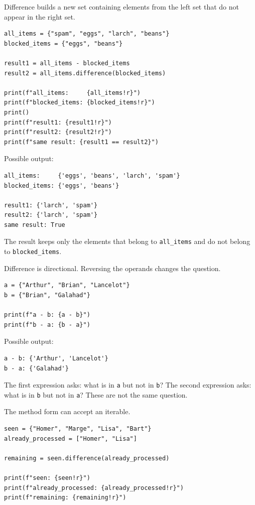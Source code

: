 Difference builds a new set containing elements from the left set that do not appear in the right set.

\begin{verbatim}
all_items = {"spam", "eggs", "larch", "beans"}
blocked_items = {"eggs", "beans"}

result1 = all_items - blocked_items
result2 = all_items.difference(blocked_items)

print(f"all_items:     {all_items!r}")
print(f"blocked_items: {blocked_items!r}")
print()
print(f"result1: {result1!r}")
print(f"result2: {result2!r}")
print(f"same result: {result1 == result2}")
\end{verbatim}

Possible output:

\begin{verbatim}
all_items:     {'eggs', 'beans', 'larch', 'spam'}
blocked_items: {'eggs', 'beans'}

result1: {'larch', 'spam'}
result2: {'larch', 'spam'}
same result: True
\end{verbatim}

The result keeps only the elements that belong to \texttt{all\_items} and do not belong to \texttt{blocked\_items}.

Difference is directional. Reversing the operands changes the question.

\begin{verbatim}
a = {"Arthur", "Brian", "Lancelot"}
b = {"Brian", "Galahad"}

print(f"a - b: {a - b}")
print(f"b - a: {b - a}")
\end{verbatim}

Possible output:

\begin{verbatim}
a - b: {'Arthur', 'Lancelot'}
b - a: {'Galahad'}
\end{verbatim}

The first expression asks: what is in \texttt{a} but not in \texttt{b}? The second expression asks: what is in \texttt{b} but not in \texttt{a}? These are not the same question.

The method form can accept an iterable.

\begin{verbatim}
seen = {"Homer", "Marge", "Lisa", "Bart"}
already_processed = ["Homer", "Lisa"]

remaining = seen.difference(already_processed)

print(f"seen: {seen!r}")
print(f"already_processed: {already_processed!r}")
print(f"remaining: {remaining!r}")
\end{verbatim}

